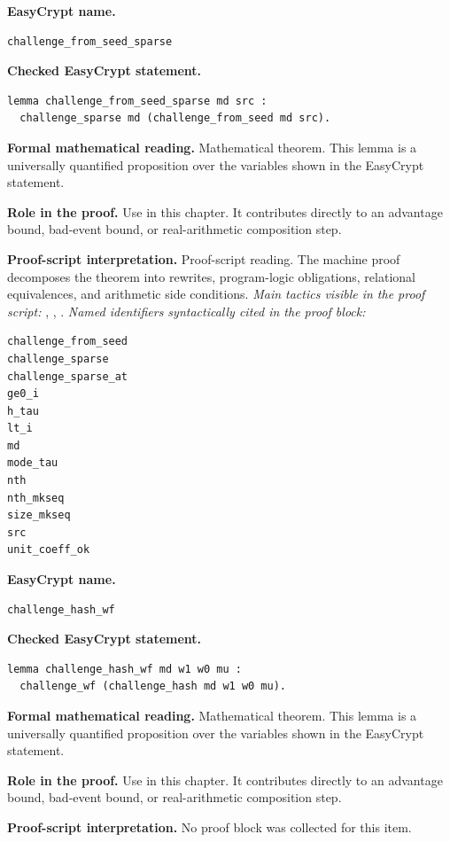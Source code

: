 \begin{formaltheorem}
\noindent\textbf{EasyCrypt name.}
\begin{lstlisting}[language=EasyCrypt,basicstyle=\ttfamily\scriptsize]
challenge_from_seed_sparse
\end{lstlisting}
\noindent\textbf{Checked EasyCrypt statement.}
\begin{lstlisting}[language=EasyCrypt,basicstyle=\ttfamily\scriptsize]
lemma challenge_from_seed_sparse md src :
  challenge_sparse md (challenge_from_seed md src).
\end{lstlisting}
\noindent\textbf{Formal mathematical reading.}
Mathematical theorem. This lemma is a universally quantified proposition over the variables shown in the EasyCrypt statement.

\noindent\textbf{Role in the proof.}
Use in this chapter. It contributes directly to an advantage bound, bad-event bound, or real-arithmetic composition step.

\noindent\textbf{Proof-script interpretation.}
Proof-script reading. The machine proof decomposes the theorem into rewrites, program-logic obligations, relational equivalences, and arithmetic side conditions.
\emph{Main tactics visible in the proof script:} , , .
\emph{Named identifiers syntactically cited in the proof block:}
\begin{lstlisting}[language=EasyCrypt,basicstyle=\ttfamily\scriptsize]
challenge_from_seed
challenge_sparse
challenge_sparse_at
ge0_i
h_tau
lt_i
md
mode_tau
nth
nth_mkseq
size_mkseq
src
unit_coeff_ok
\end{lstlisting}

\end{formaltheorem}

\begin{formaltheorem}
\noindent\textbf{EasyCrypt name.}
\begin{lstlisting}[language=EasyCrypt,basicstyle=\ttfamily\scriptsize]
challenge_hash_wf
\end{lstlisting}
\noindent\textbf{Checked EasyCrypt statement.}
\begin{lstlisting}[language=EasyCrypt,basicstyle=\ttfamily\scriptsize]
lemma challenge_hash_wf md w1 w0 mu :
  challenge_wf (challenge_hash md w1 w0 mu).
\end{lstlisting}
\noindent\textbf{Formal mathematical reading.}
Mathematical theorem. This lemma is a universally quantified proposition over the variables shown in the EasyCrypt statement.

\noindent\textbf{Role in the proof.}
Use in this chapter. It contributes directly to an advantage bound, bad-event bound, or real-arithmetic composition step.

\noindent\textbf{Proof-script interpretation.}
No proof block was collected for this item.

\end{formaltheorem}


